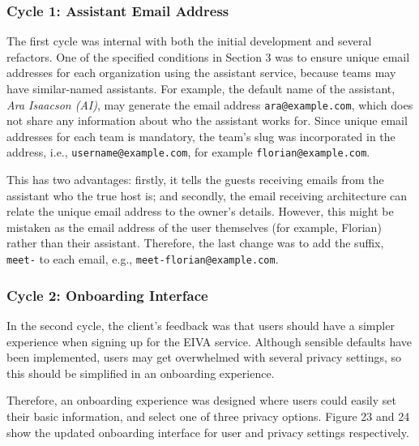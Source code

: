 \documentclass{article}
\begin{document}
\subsubsection{Cycle 1: Assistant Email Address}

The first cycle was internal with both the initial development and several refactors. One of the specified conditions in Section 3 was to ensure unique email addresses for each organization using the assistant service, because teams may have similar-named assistants. For example, the default name of the assistant, \emph{Ara Isaacson (AI)}, may generate the email address \texttt{ara@example.com}, which does not share any information about who the assistant works for. Since unique email addresses for each team is mandatory, the team's slug was incorporated in the address, i.e., \texttt{username@example.com}, for example \texttt{florian@example.com}. 

This has two advantages: firstly, it tells the guests receiving emails from the assistant who the true host is; and secondly, the email receiving architecture can relate the unique email address to the owner's details. However, this might be mistaken as the email address of the user themselves (for example, Florian) rather than their assistant. Therefore, the last change was to add the suffix, \texttt{meet-} to each email, e.g., \texttt{meet-florian@example.com}.

\subsubsection{Cycle 2: Onboarding Interface}

In the second cycle, the client's feedback was that users should have a simpler experience when signing up for the EIVA service. Although sensible defaults have been implemented, users may get overwhelmed with several privacy settings, so this should be simplified in an onboarding experience.

Therefore, an onboarding experience was designed where users could easily set their basic information, and select one of three privacy options. Figure 23 and 24 show the updated onboarding interface for user and privacy settings respectively.
\end{document}

